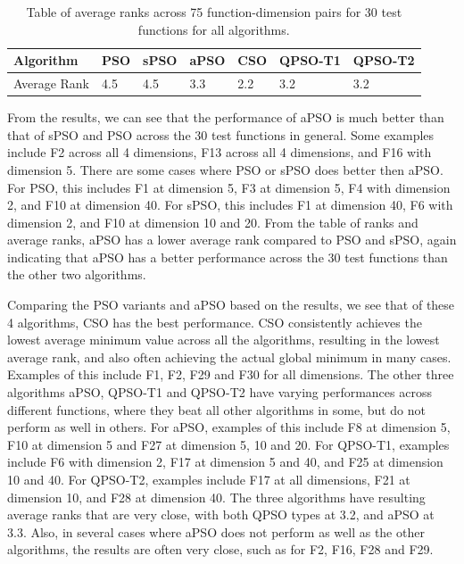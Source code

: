 \documentclass[12pt]{article}
\theoremstyle{definition}
\begin{document}
\begin{landscape}
\begin{scriptsize}

\end{scriptsize}
\end{landscape}

\begin{table}[H]
    \centering
    \begin{tabular}{|l|l|l|l|l|l|l|}
    \toprule
    Algorithm & PSO & sPSO & aPSO & CSO & QPSO-T1 & QPSO-T2 \\ \midrule
    Average Rank & 4.5 & 4.5 & 3.3 & 2.2 & 3.2 & 3.2 \\
    \bottomrule
    \end{tabular}
    \caption{Table of average ranks across 75 function-dimension pairs for 30 test functions for all algorithms.}
    \label{tab:rank summary}
\end{table}

From the results, we can see that the performance of aPSO is much better than that of sPSO and PSO across the 30 test functions in general. Some examples include F2 across all 4 dimensions, F13 across all 4 dimensions, and F16 with dimension 5. There are some cases where PSO or sPSO does better then aPSO. For PSO, this includes F1 at dimension 5, F3 at dimension 5, F4 with dimension 2, and F10 at dimension 40. For sPSO, this includes F1 at dimension 40, F6 with dimension 2, and F10 at dimension 10 and 20. From the table of ranks and average ranks, aPSO has a lower average rank compared to PSO and sPSO, again indicating that aPSO has a better performance across the 30 test functions than the other two algorithms. \newline

Comparing the PSO variants and aPSO based on the results, we see that of these 4 algorithms, CSO has the best performance. CSO consistently achieves the lowest average minimum value across all the algorithms, resulting in the lowest average rank, and also often achieving the actual global minimum in many cases. Examples of this include F1, F2, F29 and F30 for all dimensions. The other three algorithms aPSO, QPSO-T1 and QPSO-T2 have varying performances across different functions, where they beat all other algorithms in some, but do not perform as well in others. For aPSO, examples of this include F8 at dimension 5, F10 at dimension 5 and F27 at dimension 5, 10 and 20. For QPSO-T1, examples include F6 with dimension 2, F17 at dimension 5 and 40, and F25 at dimension 10 and 40. For QPSO-T2, examples include F17 at all dimensions, F21 at dimension 10, and F28 at dimension 40. The three algorithms have resulting average ranks that are very close, with both QPSO types at 3.2, and aPSO at 3.3. Also, in several cases where aPSO does not perform as well as the other algorithms, the results are often very close, such as for F2, F16, F28 and F29. \newline
\end{document}
